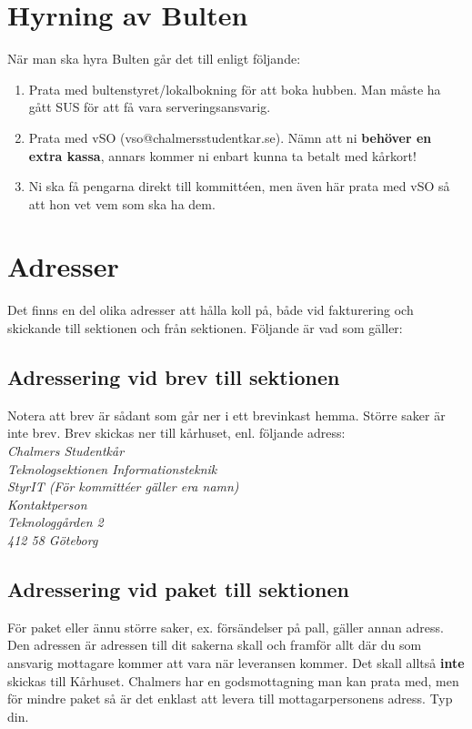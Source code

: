 \documentclass{article}
\newcommand\tab[1][1cm]{\hspace*{#1}}
\begin{document}
\section{Hyrning av Bulten}
När man ska hyra Bulten går det till enligt följande: 
\begin{enumerate}
    \item Prata med bultenstyret/lokalbokning för att boka hubben. Man måste ha gått SUS för att få vara serveringsansvarig.
    \item Prata med vSO (vso@chalmersstudentkar.se). Nämn att ni \textbf{behöver en extra kassa}, annars kommer ni enbart kunna ta betalt med kårkort!
    \item Ni ska få pengarna direkt till kommittéen, men även här prata med vSO så att hon vet vem som ska ha dem. 
\end{enumerate}

\section{Adresser}
Det finns en del olika adresser att hålla koll på, både vid fakturering och skickande till sektionen och från sektionen. Följande är vad som gäller: 

\subsection{Adressering vid brev till sektionen}
Notera att brev är sådant som går ner i ett brevinkast hemma. Större saker är inte brev. Brev skickas ner till kårhuset, enl. följande adress: \\

\textit{\tab[0.5cm]Chalmers Studentkår \\
\tab Teknologsektionen Informationsteknik \\
\tab StyrIT (För kommittéer gäller era namn) \\
\tab Kontaktperson \\
\tab Teknologgården 2 \\
\tab 412 58 Göteborg}

\subsection{Adressering vid paket till sektionen}
För paket eller ännu större saker, ex. försändelser på pall, gäller annan adress. Den adressen är adressen till dit sakerna skall och framför allt där du som ansvarig mottagare kommer att vara när leveransen kommer. Det skall alltså \textbf{inte} skickas till Kårhuset. Chalmers har en godsmottagning man kan prata med, men för mindre paket så är det enklast att levera till mottagarpersonens adress. Typ din. 
\end{document}

